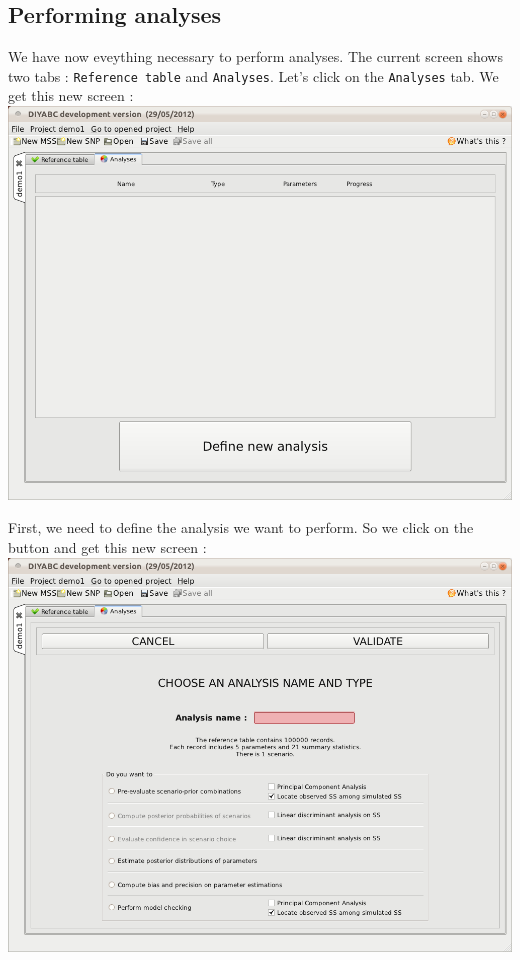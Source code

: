 \subsection{Performing analyses}

We have now eveything necessary to perform analyses. The current screen shows two tabs : \texttt{Reference table} and \texttt{Analyses}. Let's click on the \texttt{Analyses} tab. We get this new screen :\\

\includegraphics[scale=0.35]{gui_pictures/Capture-DIYABC-27.png} 

First, we need to define the analysis we want to perform. So we click on the  button and get this new screen :\\

\includegraphics[scale=0.35]{gui_pictures/Capture-DIYABC-28.png} 

